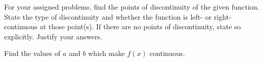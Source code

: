 \documentclass{siproblemset}
\begin{document}
\pagebreak
    \begin{multipartquestion}
        For your assigned problems, find the points of discontinuity of the given function. State the type of discontinuity and whether the function is left- or right-continuous at those point(s). If there are no points of discontinuity, state so explicitly. Justify your answers.
        \begin{multicols}{2}
            \smallspace
            \smallspace
            \smallspace
            \smallspace
            \smallspace
            \smallspace
        \end{multicols}
        \smallspace
    \end{multipartquestion}
    
    \begin{multipartquestion}
        Find the values of $a$ and $b$ which make $f(x)$ continuous.
    \end{multipartquestion}
\end{document}
